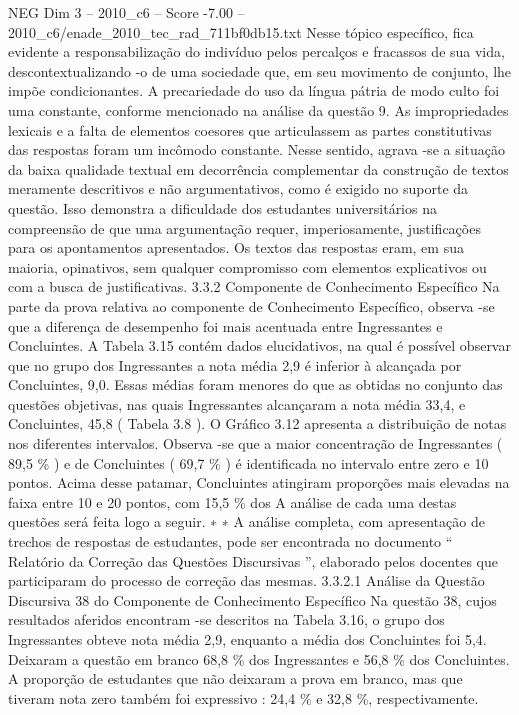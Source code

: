 \begin{textsample}{NEG Dim 3 – 2010\_c6 – Score -7.00 – 2010\_c6/enade\_2010\_tec\_rad\_711bf0db15.txt}
Nesse tópico específico, fica evidente a responsabilização do indivíduo pelos percalços e fracassos de sua vida, descontextualizando -o de uma sociedade que, em seu movimento de conjunto, lhe impõe condicionantes.
A precariedade do uso da língua pátria de modo culto foi uma constante, conforme mencionado na análise da questão 9.
As impropriedades lexicais e a falta de elementos coesores que articulassem as partes constitutivas das respostas foram um incômodo constante.
Nesse sentido, agrava -se a situação da baixa qualidade textual em decorrência complementar da construção de textos meramente descritivos e não argumentativos, como é exigido no suporte da questão.
Isso demonstra a dificuldade dos estudantes universitários na compreensão de que uma argumentação requer, imperiosamente, justificações para os apontamentos apresentados.
Os textos das respostas eram, em sua maioria, opinativos, sem qualquer compromisso com elementos explicativos ou com a busca de justificativas. 3.3.2 Componente de Conhecimento Específico Na parte da prova relativa ao componente de Conhecimento Específico, observa -se que a diferença de desempenho foi mais acentuada entre Ingressantes e Concluintes.
A Tabela 3.15 contém dados elucidativos, na qual é possível observar que no grupo dos Ingressantes a nota média 2,9 é inferior à alcançada por Concluintes, 9,0.
Essas médias foram menores do que as obtidas no conjunto das questões objetivas, nas quais Ingressantes alcançaram a nota média 33,4, e Concluintes, 45,8 ( Tabela 3.8 ).
O Gráfico 3.12 apresenta a distribuição de notas nos diferentes intervalos.
Observa -se que a maior concentração de Ingressantes ( 89,5 \% ) e de Concluintes ( 69,7 \% ) é identificada no intervalo entre zero e 10 pontos.
Acima desse patamar, Concluintes atingiram proporções mais elevadas na faixa entre 10 e 20 pontos, com 15,5 \% dos A análise de cada uma destas questões será feita logo a seguir. ∗ ∗ A análise completa, com apresentação de trechos de respostas de estudantes, pode ser encontrada no documento “ Relatório da Correção das Questões Discursivas ”, elaborado pelos docentes que participaram do processo de correção das mesmas. 3.3.2.1 Análise da Questão Discursiva 38 do Componente de Conhecimento Específico Na questão 38, cujos resultados aferidos encontram -se descritos na Tabela 3.16, o grupo dos Ingressantes obteve nota média 2,9, enquanto a média dos Concluintes foi 5,4.
Deixaram a questão em branco 68,8 \% dos Ingressantes e 56,8 \% dos Concluintes.
A proporção de estudantes que não deixaram a prova em branco, mas que tiveram nota zero também foi expressivo : 24,4 \% e 32,8 \%, respectivamente.

\end{textsample}
